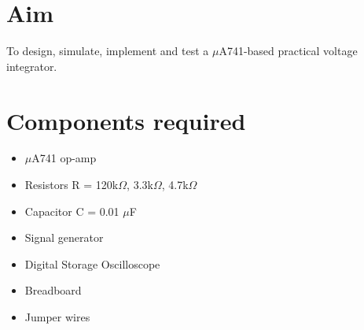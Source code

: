 \documentclass[12pt, titlepage]{article}
\theoremstyle{definition}
\begin{document}
  \newpage
  \setcounter{page}{1}
  \section{Aim}
    To design, simulate, implement and test a $\mu$A741-based practical voltage integrator.

  \section*{Components required}
    \begin{itemize}
      \item $\mu$A741 op-amp
      \item Resistors R = 120k$\Omega$, 3.3k$\Omega$, 4.7k$\Omega$
      \item Capacitor C = 0.01 $\mu$F
      \item Signal generator
      \item Digital Storage Oscilloscope
      \item Breadboard
      \item Jumper wires
    \end{itemize}


  \newpage
\end{document}
